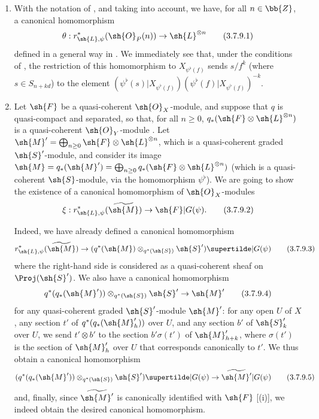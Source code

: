 \begin{remarks}[3.7.9]
\label{II.3.7.9}
\medskip\noindent
\begin{enumerate}
  \item[(i)] With the notation of , and taking  into account, we have, for all $n\in\bb{Z}$, a canonical homomorphism
    \[
    \label{II.3.7.9.1}
      \theta : r_{\sh{L},\psi}^*(\sh{O}_P(n)) \to \sh{L}^{\otimes n}
    \tag{3.7.9.1}
    \]
    defined in a general way in .
    We immediately see that, under the conditions of , the restriction of this homomorphism to $X_{\psi^\flat(f)}$ sends $s/f^k$ (where $s\in S_{n+kd}$) to the element $(\psi^\flat(s)|X_{\psi^\flat(f)})(\psi^\flat(f)|X_{\psi^\flat(f)})^{-k}$.
  \item[(ii)] Let $\sh{F}$ be a quasi-coherent $\sh{O}_X$-module, and suppose that $q$ is quasi-compact and separated, so that, for all $n\geq0$, $q_*(\sh{F}\otimes\sh{L}^{\otimes n})$ is a quasi-coherent $\sh{O}_Y$-module .
    Let $\sh{M}'=\bigoplus_{n\geq0}\sh{F}\otimes\sh{L}^{\otimes n}$, which is a quasi-coherent graded $\sh{S}'$-module, and consider its image $\sh{M}=q_*(\sh{M}')=\bigoplus_{n\geq0}q_*(\sh{F}\otimes\sh{L}^{\otimes n})$ (which is a quasi-coherent $\sh{S}$-module, via the homomorphism $\psi^\flat$).
    We are going to show the existence of a canonical homomorphism of $\sh{O}_X$-modules
    \[
    \label{II.3.7.9.2}
      \xi : r_{\sh{L},\psi}^*(\widetilde{\sh{M}}) \to \sh{F}|G(\psi).
    \tag{3.7.9.2}
    \]

    Indeed, we have already defined  a canonical homomorphism
    \[
    \label{II.3.7.9.3}
      r_{\sh{L},\psi}^*(\widetilde{\sh{M}}) \to (q^*(\sh{M})\otimes_{q^*(\sh{S})}\sh{S}')\supertilde|G(\psi)
    \tag{3.7.9.3}
    \]
    where the right-hand side is considered as a quasi-coherent sheaf on $\Proj(\sh{S}')$.
    We also have a canonical homomorphism
    \[
    \label{II.3.7.9.4}
      q^*(q_*(\sh{M}'))\otimes_{q^*(\sh{S})}\sh{S}' \to \sh{M}'
    \tag{3.7.9.4}
    \]
    for any quasi-coherent graded $\sh{S}'$-module $\sh{M}'$: for any open $U$ of $X$, any section $t'$ of $q^*(q_*(\sh{M}'_h))$ over $U$, and any section $b'$ of $\sh{S}'_k$ over $U$, we send $t'\otimes b'$ to the section $b'\sigma(t')$ of $\sh{M}'_{h+k}$, where $\sigma(t')$ is the section of $\sh{M}'_h$ over $U$ that corresponds canonically  to $t'$.
    We thus obtain a canonical homomorphism
    \[
    \label{II.3.7.9.5}
      (q^*(q_*(\sh{M}'))\otimes_{q^*(\sh{S})}\sh{S}')\supertilde|G(\psi) \to \widetilde{\sh{M}'}|G(\psi)
    \tag{3.7.9.5}
    \]
    and, finally, since $\widetilde{\sh{M}'}$ is canonically identified with $\sh{F}$ [(i)], we indeed obtain the desired canonical homomorphism.


\end{enumerate}
\end{remarks}
